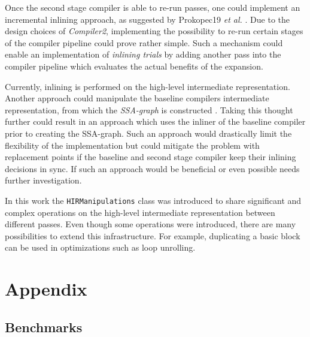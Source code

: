 \documentclass[draft, final]{vutinfth} %
\begin{document}
Once the second stage compiler is able to re-run passes, one could implement an incremental inlining approach, as suggested by Prokopec19 \emph{et al.} \cite{Prokopec19}. Due to the design choices of \emph{Compiler2}, implementing the possibility to re-run certain stages of the compiler pipeline could prove rather simple. Such a mechanism could enable an implementation of \emph{inlining trials} by adding another pass into the compiler pipeline which evaluates the actual benefits of the expansion.

Currently, inlining is performed on the high-level intermediate representation. Another approach could manipulate the baseline compilers intermediate representation, from which the \emph{SSA-graph} is constructed \cite{Eisl13}. Taking this thought further could result in an approach which uses the inliner of the baseline compiler prior to creating the SSA-graph. Such an approach would drastically limit the flexibility of the implementation but could mitigate the problem with replacement points if the baseline and second stage compiler keep their inlining decisions in sync. If such an approach would be beneficial or even possible needs further investigation.

In this work the \texttt{HIRManipulations} class was introduced to share significant and complex operations on the high-level intermediate representation between different passes. Even though some operations were introduced, there are many possibilities to extend this infrastructure. For example, duplicating a basic block can be used in optimizations such as loop unrolling.

\backmatter


\printbibliography[title={Bibliography}]

\nocite{Implementation}

\chapter{Appendix}

\section{Benchmarks}








\end{document}
